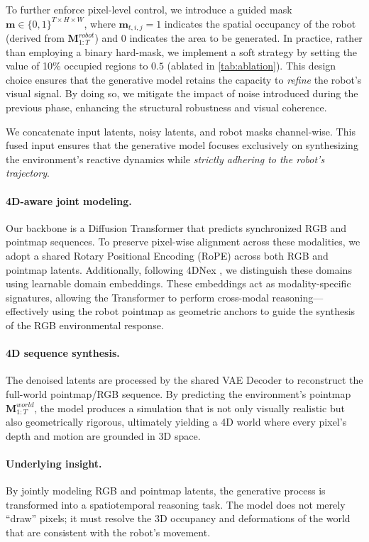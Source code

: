 To further enforce pixel-level control, we introduce a guided mask $\mathbf{m} \in \{0, 1\}^{T \times H \times W}$, where $\mathbf{m}_{t,i,j} = 1$ indicates the spatial occupancy of the robot (derived from $\mathbf{M}_{1:T}^{robot}$) and $0$ indicates the area to be generated. In practice, rather than employing a binary hard-mask, we implement a soft strategy by setting the value of 10\% occupied regions to $0.5$ (ablated in \cref{tab:ablation}). This design choice ensures that the generative model retains the capacity to \textit{refine} the robot's visual signal. By doing so, we mitigate the impact of noise introduced during the previous phase, enhancing the structural robustness and visual coherence.

We concatenate input latents, noisy latents, and robot masks channel-wise. This fused input ensures that the generative model focuses exclusively on synthesizing the environment's reactive dynamics while \textit{strictly adhering to the robot’s trajectory}.

\paragraph{4D-aware joint modeling.}
Our backbone is a Diffusion Transformer \cite{dit} that predicts synchronized RGB and pointmap sequences. To preserve pixel-wise alignment across these modalities, we adopt a shared Rotary Positional Encoding (RoPE) \cite{su2024roformer} across both RGB and pointmap latents. Additionally, following 4DNex \cite{chen20254dnex}, we distinguish these domains using learnable domain embeddings. These embeddings act as modality-specific signatures, allowing the Transformer to perform cross-modal reasoning—effectively using the robot pointmap as geometric anchors to guide the synthesis of the RGB environmental response.

\paragraph{4D sequence synthesis.} 
The denoised latents are processed by the shared VAE Decoder to reconstruct the full-world pointmap/RGB sequence. By predicting the environment's pointmap $\mathbf{M}_{1:T}^{world}$, the model produces a simulation that is not only visually realistic but also geometrically rigorous, ultimately yielding a 4D world where every pixel's depth and motion are grounded in 3D space.

\paragraph{Underlying insight.} 
By jointly modeling RGB and pointmap latents, the generative process is transformed into a spatiotemporal reasoning task. The model does not merely “draw” pixels; it must resolve the 3D occupancy and deformations of the world that are consistent with the robot's movement. 

